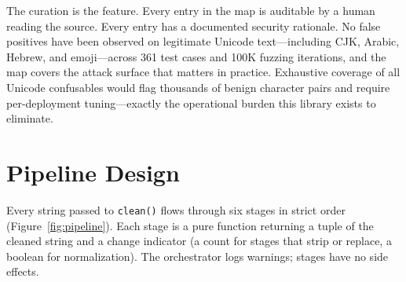 \documentclass[11pt,letterpaper]{article}
\begin{document}
The curation is the feature. Every entry in the map is auditable by a human reading the source. Every entry has a documented security rationale. No false positives have been observed on legitimate Unicode text---including CJK, Arabic, Hebrew, and emoji---across 361 test cases and 100K fuzzing iterations, and the map covers the attack surface that matters in practice. Exhaustive coverage of all Unicode confusables would flag thousands of benign character pairs and require per-deployment tuning---exactly the operational burden this library exists to eliminate.


\section{Pipeline Design}

Every string passed to \texttt{clean()} flows through six stages in strict order (Figure~\ref{fig:pipeline}). Each stage is a pure function returning a tuple of the cleaned string and a change indicator (a count for stages that strip or replace, a boolean for normalization). The orchestrator logs warnings; stages have no side effects.
\end{document}
